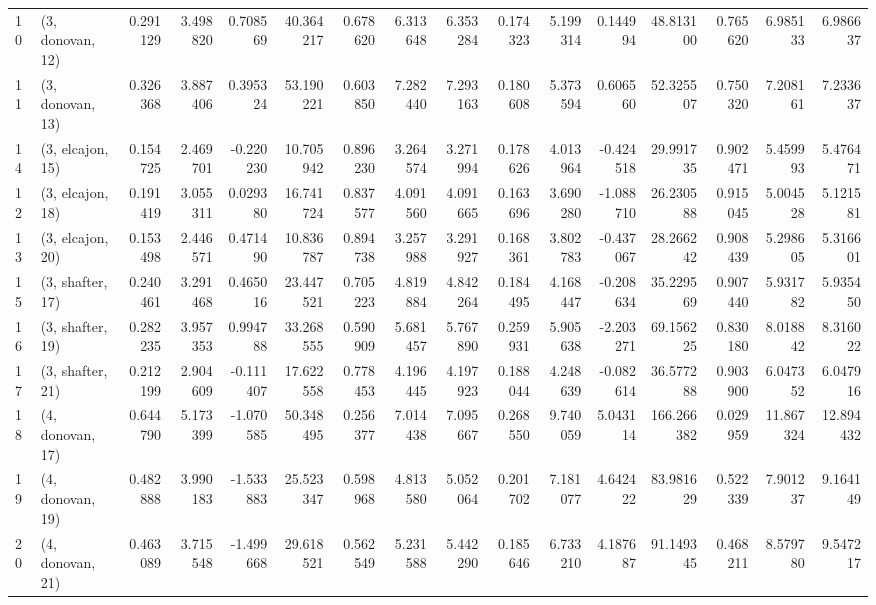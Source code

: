 \begin{tabular}{llrrrrrrrrrrrrrr}
10 &  (3, donovan, 12) &   0.291129 &  3.498820 &  0.708569 &  40.364217 &  0.678620 &   6.313648 &  6.353284 &  0.174323 &  5.199314 &  0.144994 &   48.813100 &  0.765620 &   6.985133 &   6.986637 \\
11 &  (3, donovan, 13) &   0.326368 &  3.887406 &  0.395324 &  53.190221 &  0.603850 &   7.282440 &  7.293163 &  0.180608 &  5.373594 &  0.606560 &   52.325507 &  0.750320 &   7.208161 &   7.233637 \\
14 &  (3, elcajon, 15) &   0.154725 &  2.469701 & -0.220230 &  10.705942 &  0.896230 &   3.264574 &  3.271994 &  0.178626 &  4.013964 & -0.424518 &   29.991735 &  0.902471 &   5.459993 &   5.476471 \\
12 &  (3, elcajon, 18) &   0.191419 &  3.055311 &  0.029380 &  16.741724 &  0.837577 &   4.091560 &  4.091665 &  0.163696 &  3.690280 & -1.088710 &   26.230588 &  0.915045 &   5.004528 &   5.121581 \\
13 &  (3, elcajon, 20) &   0.153498 &  2.446571 &  0.471490 &  10.836787 &  0.894738 &   3.257988 &  3.291927 &  0.168361 &  3.802783 & -0.437067 &   28.266242 &  0.908439 &   5.298605 &   5.316601 \\
15 &  (3, shafter, 17) &   0.240461 &  3.291468 &  0.465016 &  23.447521 &  0.705223 &   4.819884 &  4.842264 &  0.184495 &  4.168447 & -0.208634 &   35.229569 &  0.907440 &   5.931782 &   5.935450 \\
16 &  (3, shafter, 19) &   0.282235 &  3.957353 &  0.994788 &  33.268555 &  0.590909 &   5.681457 &  5.767890 &  0.259931 &  5.905638 & -2.203271 &   69.156225 &  0.830180 &   8.018842 &   8.316022 \\
17 &  (3, shafter, 21) &   0.212199 &  2.904609 & -0.111407 &  17.622558 &  0.778453 &   4.196445 &  4.197923 &  0.188044 &  4.248639 & -0.082614 &   36.577288 &  0.903900 &   6.047352 &   6.047916 \\
18 &  (4, donovan, 17) &   0.644790 &  5.173399 & -1.070585 &  50.348495 &  0.256377 &   7.014438 &  7.095667 &  0.268550 &  9.740059 &  5.043114 &  166.266382 &  0.029959 &  11.867324 &  12.894432 \\
19 &  (4, donovan, 19) &   0.482888 &  3.990183 & -1.533883 &  25.523347 &  0.598968 &   4.813580 &  5.052064 &  0.201702 &  7.181077 &  4.642422 &   83.981629 &  0.522339 &   7.901237 &   9.164149 \\
20 &  (4, donovan, 21) &   0.463089 &  3.715548 & -1.499668 &  29.618521 &  0.562549 &   5.231588 &  5.442290 &  0.185646 &  6.733210 &  4.187687 &   91.149345 &  0.468211 &   8.579780 &   9.547217 \\

\end{tabular}
